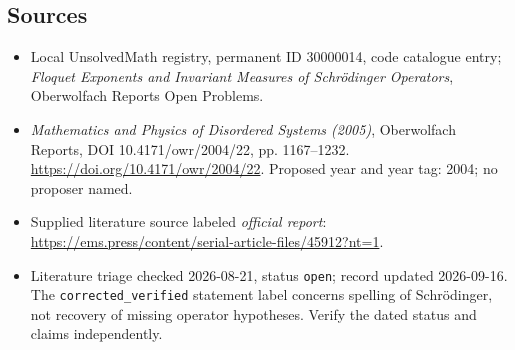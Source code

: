 \documentclass[11pt]{article}
\begin{document}
\subsection{Sources}
\begin{itemize}\item Local UnsolvedMath registry, permanent ID 30000014, code catalogue entry; \emph{Floquet Exponents and Invariant Measures of Schr\"odinger Operators}, Oberwolfach Reports Open Problems.\item \emph{Mathematics and Physics of Disordered Systems (2005)}, Oberwolfach Reports, DOI 10.4171/owr/2004/22, pp. 1167--1232. \url{https://doi.org/10.4171/owr/2004/22}. Proposed year and year tag: 2004; no proposer named.\item Supplied literature source labeled \emph{official report}: \url{https://ems.press/content/serial-article-files/45912?nt=1}.\item Literature triage checked 2026-08-21, status \texttt{open}; record updated 2026-09-16. The \texttt{corrected\_verified} statement label concerns spelling of Schr\"odinger, not recovery of missing operator hypotheses. Verify the dated status and claims independently.\end{itemize}
\end{document}
